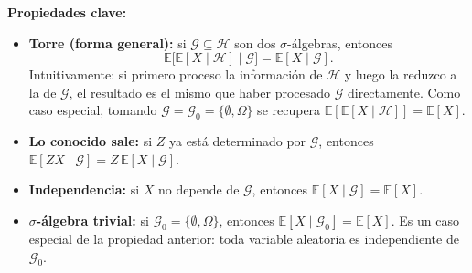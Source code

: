\documentclass[12pt]{book}
\begin{document}
\textbf{Propiedades clave:}
\begin{itemize}
    \item \textbf{Torre (forma general):} si $\mathcal{G} \subseteq \mathcal{H}$ son dos $\sigma$-álgebras, entonces
    \[
        \mathbb{E}\bigl[\mathbb{E}[X \mid \mathcal{H}] \mid \mathcal{G}\bigr] = \mathbb{E}[X \mid \mathcal{G}].
    \]
    Intuitivamente: si primero proceso la información de $\mathcal{H}$ y luego la reduzco a la de $\mathcal{G}$, el resultado es el mismo que haber procesado $\mathcal{G}$ directamente. Como caso especial, tomando $\mathcal{G} = \mathcal{G}_0 = \{\emptyset, \Omega\}$ se recupera $\mathbb{E}[\mathbb{E}[X \mid \mathcal{H}]] = \mathbb{E}[X]$.
    \item \textbf{Lo conocido sale:} si $Z$ ya está determinado por $\mathcal{G}$, entonces $\mathbb{E}[ZX \mid \mathcal{G}] = Z\,\mathbb{E}[X \mid \mathcal{G}]$.
    \item \textbf{Independencia:} si $X$ no depende de $\mathcal{G}$, entonces $\mathbb{E}[X \mid \mathcal{G}] = \mathbb{E}[X]$.
    \item \textbf{$\sigma$-álgebra trivial:} si $\mathcal{G}_0 = \{\emptyset, \Omega\}$, entonces $\mathbb{E}[X \mid \mathcal{G}_0] = \mathbb{E}[X]$. Es un caso especial de la propiedad anterior: toda variable aleatoria es independiente de $\mathcal{G}_0$.
\end{itemize}
\end{document}
